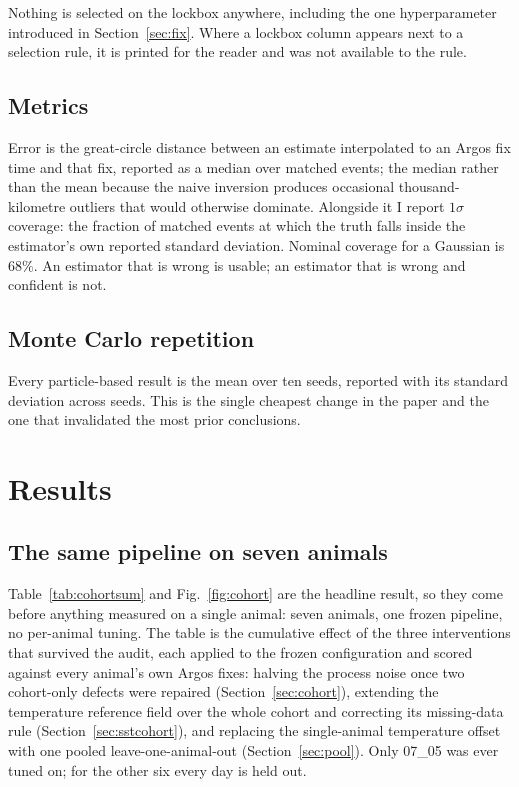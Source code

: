 \documentclass[conference]{IEEEtran}
\begin{document}
Nothing is selected on the lockbox anywhere, including the one hyperparameter
introduced in Section~\ref{sec:fix}. Where a lockbox column appears next to a
selection rule, it is printed for the reader and was not available to the rule.

\subsection{Metrics}
Error is the great-circle distance between an estimate interpolated to an Argos
fix time and that fix, reported as a median over matched events; the median
rather than the mean because the naive inversion produces occasional
thousand-kilometre outliers that would otherwise dominate. Alongside it I report
$1\sigma$ coverage: the fraction of matched events at which the truth falls
inside the estimator's own reported standard deviation. Nominal coverage for a
Gaussian is $68\%$. An estimator that is wrong is usable; an estimator that is
wrong and confident is not.

\subsection{Monte Carlo repetition}
Every particle-based result is the mean over ten seeds, reported with its
standard deviation across seeds. This is the single cheapest change in the
paper and the one that invalidated the most prior conclusions.

\section{Results}
\subsection{The same pipeline on seven animals}
\label{sec:summary}
Table~\ref{tab:cohortsum} and Fig.~\ref{fig:cohort} are the headline result,
so they come before anything measured on a single animal: seven animals, one
frozen pipeline, no per-animal tuning. The table is the
cumulative effect of the three interventions that survived the audit, each
applied to the frozen configuration and scored against every animal's own
Argos fixes: halving the process noise once two cohort-only defects were
repaired (Section~\ref{sec:cohort}), extending the temperature reference field
over the whole cohort and correcting its missing-data rule
(Section~\ref{sec:sstcohort}), and replacing the single-animal temperature
offset with one pooled leave-one-animal-out (Section~\ref{sec:pool}). Only
07\_05 was ever tuned on; for the other six every day is held out.
\end{document}
